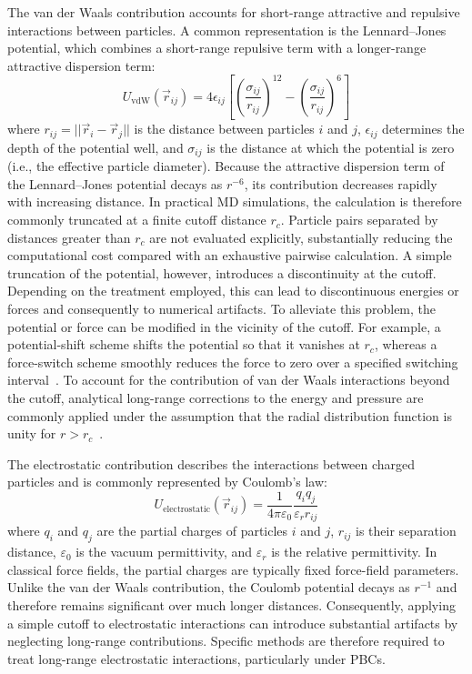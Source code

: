 The van der Waals contribution accounts for short-range attractive and repulsive interactions between particles. A common representation is the Lennard--Jones potential, which combines a short-range repulsive term with a longer-range attractive dispersion term:
\begin{equation}
U_{\mathrm{vdW}}(\vec{r}_{ij})
=
4\epsilon_{ij}
\left[
\left(\frac{\sigma_{ij}}{r_{ij}}\right)^{12}
-
\left(\frac{\sigma_{ij}}{r_{ij}}\right)^{6}
\right]
\end{equation}
where $r_{ij}=||\vec{r}_i-\vec{r}_j||$ is the distance between particles $i$ and $j$, $\epsilon_{ij}$ determines the depth of the potential well, and $\sigma_{ij}$ is the distance at which the potential is zero (i.e., the effective particle diameter).
Because the attractive dispersion term of the Lennard--Jones potential decays as $r^{-6}$, its contribution decreases rapidly with increasing
distance. In practical MD simulations, the calculation is therefore commonly truncated at a finite cutoff distance $r_c$. Particle pairs separated by distances greater than $r_c$ are not evaluated explicitly, substantially reducing the computational cost compared with an exhaustive pairwise calculation.
A simple truncation of the potential, however, introduces a discontinuity at the cutoff. Depending on the treatment employed, this can lead to discontinuous energies or forces and consequently to numerical artifacts. To alleviate this problem, the potential or force can be modified in the vicinity of the cutoff. For example, a potential-shift scheme shifts the potential so that it vanishes at $r_c$, whereas a force-switch scheme smoothly reduces the force to zero over a specified switching interval~\cite{termo_metad_presion}. To account for the contribution of van der Waals interactions beyond the cutoff, analytical long-range corrections to the energy and pressure are commonly applied under the assumption that the radial distribution function is unity for $r > r_c$~\cite{braun2018best}.

The electrostatic contribution describes the interactions between charged
particles and is commonly represented by Coulomb's law:
\begin{equation}
U_{\mathrm{electrostatic}}(\vec{r}_{ij})
=
\frac{1}{4\pi\varepsilon_0}
\frac{q_iq_j}{\varepsilon_r r_{ij}}
\end{equation}
where $q_i$ and $q_j$ are the partial charges of particles $i$ and $j$,
$r_{ij}$ is their separation distance, $\varepsilon_0$ is the vacuum
permittivity, and $\varepsilon_r$ is the relative permittivity. In
classical force fields, the partial charges are typically fixed force-field parameters.
Unlike the van der Waals contribution, the Coulomb potential decays as $r^{-1}$ and therefore remains significant over much longer distances.
Consequently, applying a simple cutoff to electrostatic interactions can introduce substantial artifacts by neglecting long-range contributions.
Specific methods are therefore required to treat long-range
electrostatic interactions, particularly under PBCs.

